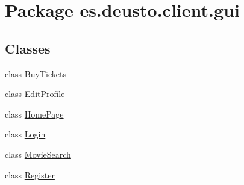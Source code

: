 \hypertarget{namespacees_1_1deusto_1_1client_1_1gui}{}\section{Package es.\+deusto.\+client.\+gui}
\label{namespacees_1_1deusto_1_1client_1_1gui}
\subsection*{Classes}
\begin{DoxyCompactItemize}
\item 
class \mbox{\hyperlink{classes_1_1deusto_1_1client_1_1gui_1_1_buy_tickets}{Buy\+Tickets}}
\item 
class \mbox{\hyperlink{classes_1_1deusto_1_1client_1_1gui_1_1_edit_profile}{Edit\+Profile}}
\item 
class \mbox{\hyperlink{classes_1_1deusto_1_1client_1_1gui_1_1_home_page}{Home\+Page}}
\item 
class \mbox{\hyperlink{classes_1_1deusto_1_1client_1_1gui_1_1_login}{Login}}
\item 
class \mbox{\hyperlink{classes_1_1deusto_1_1client_1_1gui_1_1_movie_search}{Movie\+Search}}
\item 
class \mbox{\hyperlink{classes_1_1deusto_1_1client_1_1gui_1_1_register}{Register}}
\end{DoxyCompactItemize}

